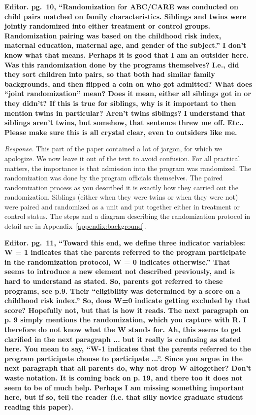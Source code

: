 \noindent \textbf{Editor. pg.\ 10, ``Randomization for ABC/CARE was conducted on child pairs matched on family characteristics. Siblings and twins were jointly randomized into either treatment or control groups. Randomization pairing was based on the childhood risk index, maternal education, maternal age, and gender of the subject.'' I don't know what that means. Perhaps it is good that I am an outsider here. Was this randomization done by the programs themselves? I.e., did they sort children into pairs, so that both had similar family backgrounds, and then flipped a coin on who got admitted? What does ``joint randomization'' mean? Does it mean, either all siblings got in or they didn't? If this is true for siblings, why is it important to then mention twins in particular? Aren't twins siblings? I understand that siblings aren't twins, but somehow, that sentence threw me off. Etc.. Please make sure this is all crystal clear, even to outsiders like me.}

\noindent \textit{Response.} This part of the paper contained a lot of jargon, for which we apologize. We now leave it out of the text to avoid confusion. For all practical matters, the importance is that admission into the program was randomized. The randomization was done by the program officials themselves. The paired randomization process as you described it is exactly how they carried out the randomization. Siblings (either when they were twins or when they were not) were paired and randomized as a unit and put together either in treatment or control status. The steps and a diagram describing the randomization protocol in detail are in Appendix~\ref{appendix:background}.

\noindent \textbf{Editor. pg.\ 11, ``Toward this end, we define three indicator variables: W = 1 indicates that the parents referred to the program participate in the randomization protocol, W = 0 indicates otherwise.'' That seems to introduce a new element not described previously, and is hard to understand as stated. So, parents got referred to these programs, see p.9. Their ``eligibility was determined by a score on a childhood risk index.'' So, does W=0 indicate getting excluded by that score? Hopefully not, but that is how it reads. The next paragraph on p. 9 simply mentions the randomization, which you capture with R. I therefore do not know what the W stands for. Ah, this seems to get clarified in the next paragraph ... but it really is confusing as stated here. You mean to say, ``W-1 indicates that the parents referred to the program participate choose to participate ...''. Since you argue in the next paragraph that all parents do, why not drop W altogether? Don't waste notation. It is coming back on p. 19, and there too it does not seem to be of much help. Perhaps I am missing something important here, but if so, tell the reader (i.e. that silly novice graduate student reading this paper).}

